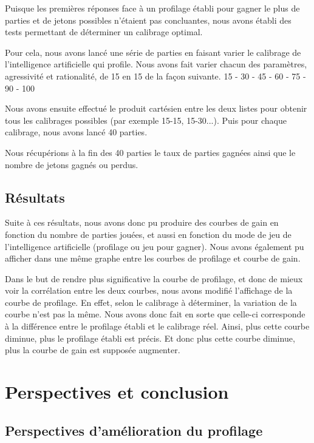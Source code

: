 \documentclass{report}
\begin{document}
	Puisque les premières réponses face à un profilage établi pour gagner le plus de parties et de jetons possibles n'étaient pas concluantes, nous avons établi des tests permettant de déterminer un calibrage optimal.\par
Pour cela, nous avons lancé une série de parties en faisant varier le calibrage de l'intelligence artificielle qui profile. Nous avons fait varier chacun des paramètres, agressivité et rationalité, de 15 en 15 de la façon suivante.
15 - 30 - 45 - 60 - 75 - 90 - 100

Nous avons ensuite effectué le produit cartésien entre les deux listes pour obtenir tous les calibrages possibles (par exemple 15-15, 15-30...). Puis pour chaque calibrage, nous avons lancé 40 parties.\par

Nous récupérions à la fin des 40 parties le taux de parties gagnées ainsi que le nombre de jetons gagnés ou perdus.



\section{Résultats}


 
 

 
Suite à ces résultats, nous avons donc pu produire des courbes de gain en fonction du nombre de parties jouées, et aussi en fonction du mode de jeu de l'intelligence artificielle (profilage ou jeu pour gagner). Nous avons également pu afficher dans une même graphe entre les courbes de profilage et courbe de gain.\par
Dans le but de rendre plus significative la courbe de profilage, et donc de mieux voir la corrélation entre les deux courbes, nous avons modifié l'affichage de la courbe de profilage. En effet, selon le calibrage à déterminer, la variation de la courbe n'est pas la même. Nous avons donc fait en sorte que celle-ci corresponde à la différence entre le profilage établi et le calibrage réel. Ainsi, plus cette courbe diminue, plus le profilage établi est précis. Et donc plus cette courbe diminue, plus la courbe de gain est supposée augmenter.\\
 

\chapter{Perspectives et conclusion}
\section{Perspectives d'amélioration du profilage}
\end{document}
